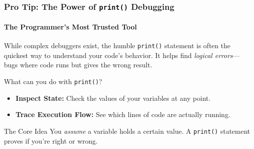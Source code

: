 \documentclass{beamer}
\begin{document}
\begin{frame}[fragile]
    \frametitle{Pro Tip: The Power of \texttt{print()} Debugging}
    \framesubtitle{The Programmer's Most Trusted Tool}

    While complex debuggers exist, the humble \texttt{print()} statement is often the quickest way to understand your code's behavior. It helps find \textit{logical errors}—bugs where code runs but gives the wrong result.

    \begin{block}{What can you do with \texttt{print()}?}
        \begin{itemize}
            \item \textbf{Inspect State:} Check the values of your variables at any point.
            \item \textbf{Trace Execution Flow:} See which lines of code are actually running.
        \end{itemize}
    \end{block}

    \begin{alertblock}{The Core Idea}
        You \textit{assume} a variable holds a certain value. A \texttt{print()} statement proves if you're right or wrong.
    \end{alertblock}

\end{frame}
\end{document}

